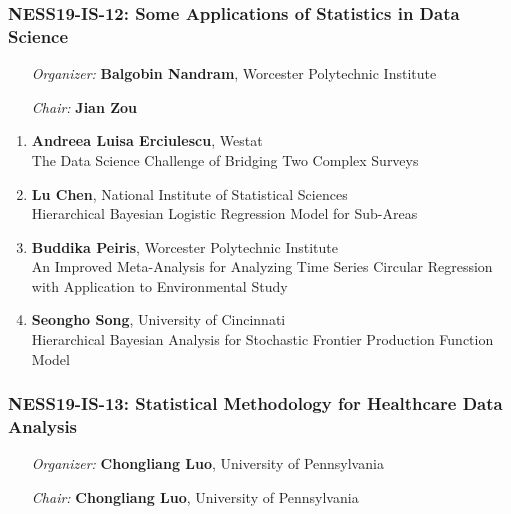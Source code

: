 \subsubsection*{NESS19-IS-12: Some Applications of Statistics in Data Science}

\begin{enumerate}[align=left]
\item [\emph{Organizer:}] \textbf{Balgobin Nandram}, Worcester Polytechnic Institute \\
\item [\emph{Chair:}] \textbf{Jian Zou}
\end{enumerate}

\begin{enumerate}
\item \textbf{Andreea Luisa Erciulescu}, Westat \\
The Data Science Challenge of Bridging Two Complex Surveys
\item \textbf{Lu Chen}, National Institute of Statistical Sciences \\
Hierarchical Bayesian Logistic Regression Model for Sub-Areas
\item \textbf{Buddika Peiris}, Worcester Polytechnic Institute \\
An Improved Meta-Analysis for Analyzing Time Series Circular Regression with Application to Environmental Study
\item \textbf{Seongho Song}, University of Cincinnati \\
Hierarchical Bayesian Analysis for Stochastic Frontier Production Function Model
\end{enumerate}

\subsubsection*{NESS19-IS-13: Statistical Methodology for Healthcare Data Analysis}

\begin{enumerate}[align=left]
\item [\emph{Organizer:}] \textbf{Chongliang Luo}, University of Pennsylvania \\
\item [\emph{Chair:}] \textbf{Chongliang Luo}, University of Pennsylvania
\end{enumerate}

